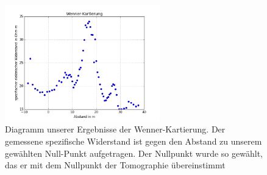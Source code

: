 \begin{figure}[h]
\centering
\includegraphics[width=0.6\textwidth]{fig/wennerkartierung.png}
\caption{Diagramm unserer Ergebnisse der Wenner-Kartierung. Der gemessene spezifische Widerstand ist gegen den Abstand zu unserem gewählten Null-Punkt aufgetragen. Der Nullpunkt wurde so gewählt, das er mit dem Nullpunkt der Tomographie übereinstimmt}
\label{abb:Wenner}
\end{figure}


